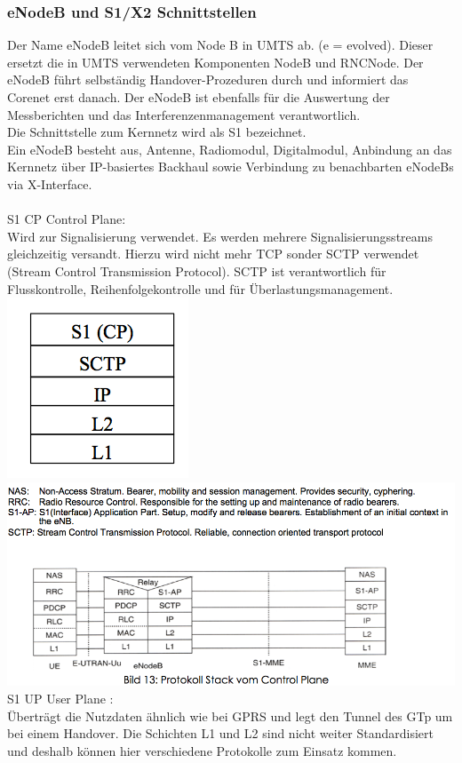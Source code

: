 \subsubsection{eNodeB und S1/X2 Schnittstellen}
Der Name eNodeB leitet sich vom Node B in UMTS ab. (e = evolved). Dieser ersetzt die in UMTS verwendeten Komponenten NodeB und RNCNode. Der eNodeB führt selbständig Handover-Prozeduren durch und informiert das Corenet erst danach. Der eNodeB ist ebenfalls für die Auswertung der Messberichten und das Interferenzenmanagement verantwortlich. \\
Die Schnittstelle zum Kernnetz wird als S1 bezeichnet. \\ 
Ein eNodeB besteht aus, Antenne, Radiomodul, Digitalmodul, Anbindung an das Kernnetz über IP-basiertes Backhaul sowie Verbindung zu benachbarten eNodeBs via X-Interface. \\ \\
S1 CP Control Plane: \\
Wird zur Signalisierung verwendet. Es werden mehrere Signalisierungsstreams gleichzeitig versandt. Hierzu wird nicht mehr TCP sonder SCTP verwendet (Stream Control Transmission Protocol). SCTP ist verantwortlich für Flusskontrolle, Reihenfolgekontrolle und für Überlastungsmanagement. \\
\includegraphics[width = 0.2 \linewidth]{./Pics/LTE2.png} 
\includegraphics[width = 0.75 \linewidth]{./Pics/LTE5.png}\\
S1 UP User Plane : \\
Überträgt die Nutzdaten ähnlich wie bei GPRS und legt den Tunnel des GTp um bei einem Handover. Die Schichten L1 und L2 sind nicht weiter Standardisiert und deshalb können hier verschiedene Protokolle zum Einsatz kommen. \\
